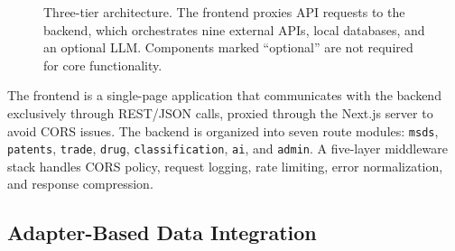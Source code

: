 \documentclass[10pt]{article}
\begin{document}
\begin{figure}[H]
\centering
{}
\caption{Three-tier architecture. The frontend proxies API requests to the backend, which orchestrates nine external APIs, local databases, and an optional LLM. Components marked ``optional'' are not required for core functionality.}
\label{fig:architecture}
\end{figure}

The frontend is a single-page application that communicates with the backend exclusively through REST/JSON calls, proxied through the Next.js server to avoid CORS issues.
The backend is organized into seven route modules: \texttt{msds}, \texttt{patents}, \texttt{trade}, \texttt{drug}, \texttt{classification}, \texttt{ai}, and \texttt{admin}.
A five-layer middleware stack handles CORS policy, request logging, rate limiting, error normalization, and response compression.

\subsection{Adapter-Based Data Integration}
\label{sec:adapters}
\end{document}
